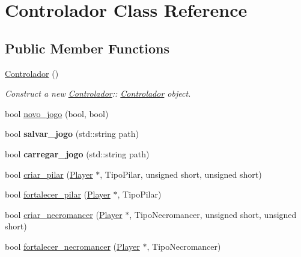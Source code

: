 \hypertarget{class_controlador}{}\section{Controlador Class Reference}
\label{class_controlador}
\subsection*{Public Member Functions}
\begin{DoxyCompactItemize}
\item 
\mbox{\label{class_controlador_a17db08229680461d4d1a2110a92ccf78}} 
\mbox{\hyperlink{class_controlador_a17db08229680461d4d1a2110a92ccf78}{Controlador}} ()
\begin{DoxyCompactList}\small\item\em Construct a new \mbox{\hyperlink{class_controlador}{Controlador}}\+:\+: \mbox{\hyperlink{class_controlador}{Controlador}} object. \end{DoxyCompactList}\item 
bool \mbox{\hyperlink{class_controlador_a89652e27b5fc06fa0489e6bae0328d33}{novo\+\_\+jogo}} (bool, bool)
\item 
\mbox{\label{class_controlador_ab1464581160e7baba397b32ac41315ab}} 
bool {\bfseries salvar\+\_\+jogo} (std\+::string path)
\item 
\mbox{\label{class_controlador_a6fac98d6cc32e0f413d55755000fca3a}} 
bool {\bfseries carregar\+\_\+jogo} (std\+::string path)
\item 
bool \mbox{\hyperlink{class_controlador_a5c4aa9d015704147f6b24ca9a90c94c1}{criar\+\_\+pilar}} (\mbox{\hyperlink{class_player}{Player}} $\ast$, Tipo\+Pilar, unsigned short, unsigned short)
\item 
bool \mbox{\hyperlink{class_controlador_a7c0445d2f378ff7d9b26d2cc77059484}{fortalecer\+\_\+pilar}} (\mbox{\hyperlink{class_player}{Player}} $\ast$, Tipo\+Pilar)
\item 
bool \mbox{\hyperlink{class_controlador_aa444d0b080f4d4ecc397819d97098a3a}{criar\+\_\+necromancer}} (\mbox{\hyperlink{class_player}{Player}} $\ast$, Tipo\+Necromancer, unsigned short, unsigned short)
\item 
bool \mbox{\hyperlink{class_controlador_a417c5d209a4fb165ecc03063b3adef80}{fortalecer\+\_\+necromancer}} (\mbox{\hyperlink{class_player}{Player}} $\ast$, Tipo\+Necromancer)

\end{DoxyCompactItemize}
